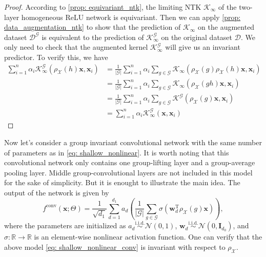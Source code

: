 \documentclass{article}
\newcommand{\T}{\mathrm{T}}
\newcommand{\G}{\mathcal{G}}
\newcommand{\R}{\mathbb{R}}
\newcommand{\X}{\mathcal{X}}
\theoremstyle{plain}
\theoremstyle{definition}
\theoremstyle{remark}
\theoremstyle{remark}
\begin{document}
\begin{proof}
  According to \cref{prop: equivariant_ntk}, the limiting NTK $\mathcal{K}_{\infty}$ of the two-layer homogeneous ReLU network is equivariant. Then we can apply \cref{prop: data_augmentation_ntk} to show that the prediction of $\mathcal{K}_{\infty}$ on the augmented dataset $\mathcal{D}^{\G}$ is equivalent to the prediction of $\mathcal{K}_{\infty}^{\G}$ on the original dataset $\mathcal{D}$.
  We only need to check that the augmented kernel $\mathcal{K}^{\G}_{\infty}$ will give us an invariant predictor. To verify this, we have 
  \begin{align}
    \sum_{i=1}^{n} \alpha_i \mathcal{K}^{\G}_{\infty} (\rho_{\X}(h)\mathbf{x}, \mathbf{x}_i) 
    &= \frac{1}{|\G|}\sum_{i=1}^{n} \alpha_i \sum_{g \in \G}\mathcal{K}_{\infty}(\rho_{\X}(g)\rho_{\X}(h)\mathbf{x}, \mathbf{x}_i) \nonumber \\
    &= \frac{1}{|\G|}\sum_{i=1}^{n} \alpha_i \sum_{g \in \G}\mathcal{K}_{\infty}(\rho_{\X}(gh)\mathbf{x}, \mathbf{x}_i) \nonumber \\
    &= \frac{1}{|\G|}\sum_{i=1}^{n} \alpha_i \sum_{g \in \G} \mathcal{K}^{\G} (\rho_{\X}(g)\mathbf{x}, \mathbf{x}_i) \nonumber \\
    &= \sum_{i=1}^{n} \alpha_i \mathcal{K}^{\G}_{\infty} (\mathbf{x}, \mathbf{x}_i) \nonumber
  \end{align}
\end{proof}

Now let's consider a group invariant convolutional network \citep{pmlr-v48-cohenc16} with the same number of parameters as in \cref{eq: shallow_nonlinear}. 
It is worth noting that this convolutional network only contains one group-lifting layer and a group-average pooling layer. 
Middle group-convolutional layers are not included in this model for the sake of simplicity. 
But it is enought to illustrate the main idea.
The output of the network is given by
\begin{equation} \label{eq: shallow_nonlinear_conv}
  f^{\text{conv}}(\mathbf{x}; \Theta) = \frac{1}{\sqrt{d_1}} \sum_{d=1}^{d_1} a_d \left( \frac{1}{|\G|}\sum_{g \in \G}\sigma\left(\mathbf{w}_d^{\T} \rho_{\X}(g) \mathbf{x}\right) \right),
\end{equation}
where the parameters are initialized as
$a_d \overset{\mathrm{i.i.d.}}{\sim} \mathcal{N}(0, 1)$, $\mathbf{w}_d \overset{\mathrm{i.i.d.}}{\sim} \mathcal{N}(0, \mathbf{I}_{d_0})$, and $\sigma: \R \to \R$ is an element-wise nonlinear activation function.
One can verify that the above model \cref{eq: shallow_nonlinear_conv} is invariant with respect to $\rho_{\X}$.
\end{document}
